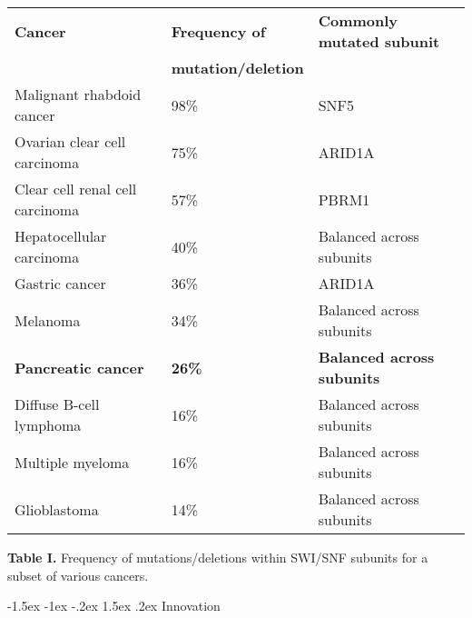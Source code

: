 \documentclass[11pt]{article}
\makeatletter
\renewcommand\section{\@startsection {section}{1}{\z@}%
{-1.5ex \@plus -1ex \@minus -.2ex}%
{1.5ex \@plus.2ex}%
{\color{dukeblue}\sffamily\Large\bfseries}}
\makeatother
\begin{document}
\begin{center}
\begin{tabular}{l p{3cm} l}
\textbf{Cancer}  & \textbf{Frequency of} & \textbf{Commonly mutated subunit} \\
& \textbf{mutation/deletion} & \\
\hline  \noalign{\smallskip}
Malignant rhabdoid cancer~\citep{Biegel1999} & 98\% & SNF5 \\
Ovarian clear cell carcinoma~\citep{Shain2013,Jones2010} & 75\% & ARID1A \\
Clear cell renal cell carcinoma~\citep{Shain2013,Varela2011} & 57\% & PBRM1\\
Hepatocellular carcinoma~\citep{Shain2013,Li2011} & 40\% & Balanced across subunits \\
Gastric cancer~\citep{Shain2013,Wang2011} & 36\% & ARID1A \\
Melanoma~\citep{Shain2013,Wei2011,Nikolaev2011,Stark2011} & 34\% & Balanced across subunits \\
\textcolor{dukeblue}{\textbf{Pancreatic cancer}~\citep{Shain2013,Jones2008,Wang2011}} & \textcolor{dukeblue}{\textbf{26\%}} & \textcolor{dukeblue}{\textbf{Balanced across subunits}} \\
Diffuse B-cell lymphoma~\citep{Shain2013,Lohr2012,Pasqualucci2011,Morin2011} & 16\% & Balanced across subunits \\
Multiple myeloma~\citep{Shain2013,Chapman2011} & 16\% & Balanced across subunits \\
Glioblastoma~\citep{Shain2013,Parsons2008} & 14\% & Balanced across subunits \\
\hline
\end{tabular}

{\sffamily \color{dukeblue} \footnotesize \textbf{Table I.} Frequency of mutations/deletions within SWI/SNF subunits for a subset of various cancers.}

\end{center}

\section{Innovation}
 
\end{document}
